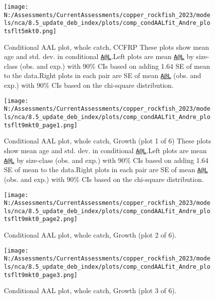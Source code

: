 \documentclass[11pt,
  english,
  letterpaper,
]{article}
\begin{document}
\begin{figure}
\centering
\texttt{[image: N:/Assessments/CurrentAssessments/copper\_rockfish\_2023/models/nca/8.5\_update\_deb\_index/plots/comp\_condAALfit\_Andre\_plotsflt5mkt0.png]}
\caption{Conditional AAL plot, whole catch, CCFRP These plots show mean age and std. dev. in conditional \href{mailto:A@L}{\nolinkurl{A@L}}.Left plots are mean \href{mailto:A@L}{\nolinkurl{A@L}} by size-class (obs. and exp.) with 90\% CIs based on adding 1.64 SE of mean to the data.Right plots in each pair are SE of mean \href{mailto:A@L}{\nolinkurl{A@L}} (obs. and exp.) with 90\% CIs based on the chi-square distribution.\label{fig:comp_condAALfit_Andre_plotsflt5mkt0}}
\end{figure}

\begin{figure}
\centering
\texttt{[image: N:/Assessments/CurrentAssessments/copper\_rockfish\_2023/models/nca/8.5\_update\_deb\_index/plots/comp\_condAALfit\_Andre\_plotsflt9mkt0\_page1.png]}
\caption{Conditional AAL plot, whole catch, Growth (plot 1 of 6) These plots show mean age and std. dev. in conditional \href{mailto:A@L}{\nolinkurl{A@L}}.Left plots are mean \href{mailto:A@L}{\nolinkurl{A@L}} by size-class (obs. and exp.) with 90\% CIs based on adding 1.64 SE of mean to the data.Right plots in each pair are SE of mean \href{mailto:A@L}{\nolinkurl{A@L}} (obs. and exp.) with 90\% CIs based on the chi-square distribution.\label{fig:comp_condAALfit_Andre_plotsflt9mkt0_page1}}
\end{figure}

\begin{figure}
\centering
\texttt{[image: N:/Assessments/CurrentAssessments/copper\_rockfish\_2023/models/nca/8.5\_update\_deb\_index/plots/comp\_condAALfit\_Andre\_plotsflt9mkt0\_page2.png]}
\caption{Conditional AAL plot, whole catch, Growth (plot 2 of 6).\label{fig:comp_condAALfit_Andre_plotsflt9mkt0_page2}}
\end{figure}

\begin{figure}
\centering
\texttt{[image: N:/Assessments/CurrentAssessments/copper\_rockfish\_2023/models/nca/8.5\_update\_deb\_index/plots/comp\_condAALfit\_Andre\_plotsflt9mkt0\_page3.png]}
\caption{Conditional AAL plot, whole catch, Growth (plot 3 of 6).\label{fig:comp_condAALfit_Andre_plotsflt9mkt0_page3}}
\end{figure}
\end{document}
